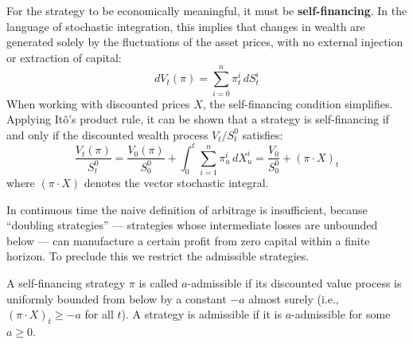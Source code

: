 For the strategy to be economically meaningful, it must be \textbf{self-financing}. In the language of stochastic integration, this implies that changes in wealth are generated solely by the fluctuations of the asset prices, with no external injection or extraction of capital:
\begin{equation}
    dV_t(\pi) = \sum_{i=0}^n \pi^i_t \, dS^i_t \label{eq:selffinancing}
\end{equation}
When working with discounted prices $X$, the self-financing condition simplifies. Applying Itô's product rule, it can be shown that a strategy is self-financing if and only if the discounted wealth process $V_t/S^0_t$ satisfies:
\begin{equation}
    \frac{V_t(\pi)}{S^0_t} = \frac{V_0(\pi)}{S^0_0} + \int_0^t \sum_{i=1}^n \pi^i_u \, dX^i_u = \frac{V_0}{S^0_0} + (\pi \cdot X)_t
\end{equation}
where $(\pi \cdot X)$ denotes the vector stochastic integral.

In continuous time the naive definition of arbitrage is insufficient, because ``doubling strategies'' --- strategies whose intermediate losses are unbounded below --- can manufacture a certain profit from zero capital within a finite horizon. To preclude this we restrict the admissible strategies.
\begin{definition}\label{def:admissible}
A self-financing strategy $\pi$ is called $a$-admissible if its discounted value process is uniformly bounded from below by a constant $-a$ almost surely (i.e., $(\pi \cdot X)_t \ge -a$ for all $t$). A strategy is admissible if it is $a$-admissible for some $a \ge 0$.
\end{definition}

